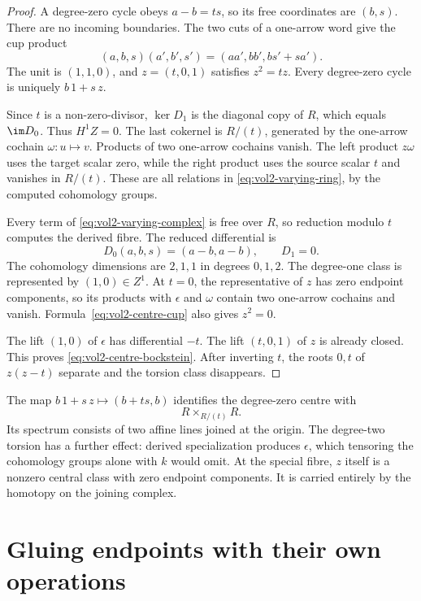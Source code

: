 \begin{proof}
A degree-zero cycle obeys $a-b=ts$, so its free coordinates
are $(b,s)$. There are no incoming boundaries.
The two cuts of a one-arrow word give the cup product
\begin{equation}\label{eq:vol2-centre-cup}
 (a,b,s)(a',b',s')=(aa',bb',bs'+sa').
\end{equation}
The unit is $(1,1,0)$, and $z=(t,0,1)$ satisfies $z^2=tz$.
Every degree-zero cycle is uniquely $b\,1+s\,z$.

Since $t$ is a non-zero-divisor, $\ker D_1$ is the diagonal
copy of $R$, which equals $\im D_0$. Thus $H^1Z=0$.
The last cokernel is $R/(t)$, generated by the one-arrow
cochain $\omega:u\mapsto v$. Products of two one-arrow
cochains vanish. The left product $z\omega$ uses the target
scalar zero, while the right product uses the source scalar
$t$ and vanishes in $R/(t)$. These are all relations in
\eqref{eq:vol2-varying-ring}, by the computed cohomology groups.

Every term of \eqref{eq:vol2-varying-complex} is free over $R$,
so reduction modulo $t$ computes the derived fibre.
The reduced differential is
\[
 D_0(a,b,s)=(a-b,a-b),
 \qquad D_1=0.
\]
The cohomology dimensions are $2,1,1$ in degrees $0,1,2$.
The degree-one class is represented by $(1,0)\in Z^1$.
At $t=0$, the representative of $z$ has zero endpoint components,
so its products with $\epsilon$ and $\omega$ contain two
one-arrow cochains and vanish. Formula~\eqref{eq:vol2-centre-cup}
also gives $z^2=0$.

The lift $(1,0)$ of $\epsilon$ has differential $-t$.
The lift $(t,0,1)$ of $z$ is already closed.
This proves \eqref{eq:vol2-centre-bockstein}.
After inverting $t$, the roots $0,t$ of $z(z-t)$ separate
and the torsion class disappears.
\end{proof}

The map $b\,1+s\,z\mapsto(b+ts,b)$ identifies the degree-zero
centre with
\[
 R\times_{R/(t)}R.
\]
Its spectrum consists of two affine lines joined at the origin.
The degree-two torsion has a further effect: derived specialization
produces $\epsilon$, which tensoring the cohomology groups alone
with $k$ would omit. At the special fibre, $z$ itself is a nonzero
central class with zero endpoint components. It is carried entirely
by the homotopy on the joining complex.

\section{Gluing endpoints with their own operations}
\label{sec:vol2-dg-triangular-centre}

